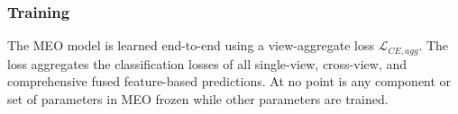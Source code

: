 %
%
%
%
\subsubsection{Training}
The MEO model is learned end-to-end using a view-aggregate loss $\mathcal{L}_{CE,agg}$. The loss aggregates the classification losses of all single-view, cross-view, and comprehensive fused feature-based predictions. At no point is any component or set of parameters in MEO frozen while other parameters are trained.

